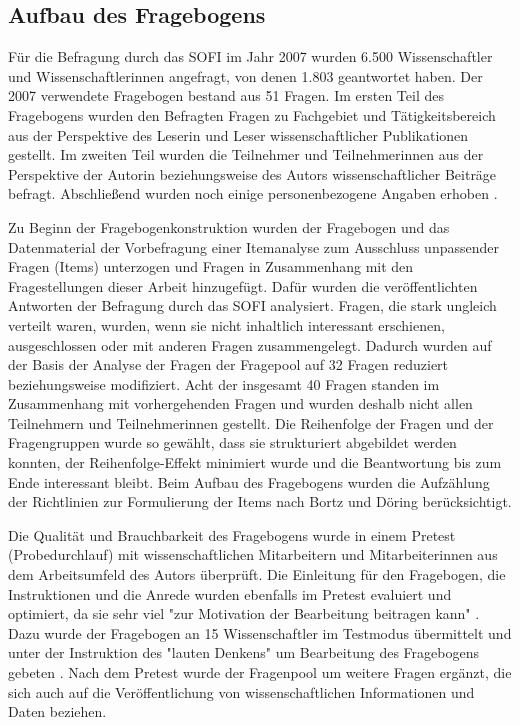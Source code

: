 \subsection{Aufbau des Fragebogens}

Für die Befragung durch das SOFI im Jahr 2007 wurden 6.500 Wissenschaftler und Wissenschaftlerinnen angefragt, von denen 1.803 geantwortet haben. Der 2007 verwendete Fragebogen bestand aus 51 Fragen. Im ersten Teil des Fragebogens wurden den Befragten Fragen zu Fachgebiet und Tätigkeitsbereich aus der Perspektive des Leserin und Leser wissenschaftlicher Publikationen gestellt. Im zweiten Teil wurden die Teilnehmer und Teilnehmerinnen aus der Perspektive der Autorin beziehungsweise des Autors wissenschaftlicher Beiträge befragt. Abschließend wurden noch einige personenbezogene Angaben erhoben \cite{Hanekop_Wittke_2007_Fragebogen}.

Zu Beginn der Fragebogenkonstruktion wurden der Fragebogen und das Datenmaterial der Vorbefragung einer Itemanalyse zum Ausschluss unpassender Fragen (Items) unterzogen und Fragen in Zusammenhang mit den Fragestellungen dieser Arbeit hinzugefügt. Dafür wurden die veröffentlichten Antworten der Befragung durch das SOFI analysiert. Fragen, die stark ungleich verteilt waren, wurden, wenn sie nicht inhaltlich interessant erschienen, ausgeschlossen oder mit anderen Fragen zusammengelegt. Dadurch wurden auf der Basis der Analyse der Fragen der Fragepool auf 32 Fragen reduziert beziehungsweise modifiziert. Acht der insgesamt 40 Fragen standen im Zusammenhang mit vorhergehenden Fragen und wurden deshalb nicht allen Teilnehmern und Teilnehmerinnen gestellt. Die Reihenfolge der Fragen und der Fragengruppen wurde so gewählt, dass sie strukturiert abgebildet werden konnten, der Reihenfolge-Effekt minimiert wurde und die Beantwortung bis zum Ende interessant bleibt. Beim Aufbau des Fragebogens wurden die Aufzählung der Richtlinien zur Formulierung der Items nach Bortz und Döring \cite{raab_2012_fragebogen} berücksichtigt.

Die Qualität und Brauchbarkeit des Fragebogens wurde in einem Pretest (Probedurchlauf) mit wissenschaftlichen Mitarbeitern und Mitarbeiterinnen aus dem Arbeitsumfeld des Autors überprüft. Die Einleitung für den Fragebogen, die Instruktionen und die Anrede wurden ebenfalls im Pretest evaluiert und optimiert, da sie sehr viel "zur Motivation der Bearbeitung beitragen kann" \cite{raab_2012_fragebogen}. Dazu wurde der Fragebogen an 15 Wissenschaftler im Testmodus übermittelt und unter der Instruktion des "lauten Denkens" um Bearbeitung des Fragebogens gebeten \cite{raab_2012_fragebogen}. Nach dem Pretest wurde der Fragenpool um weitere Fragen ergänzt, die sich auch auf die Veröffentlichung von wissenschaftlichen Informationen und Daten beziehen.

